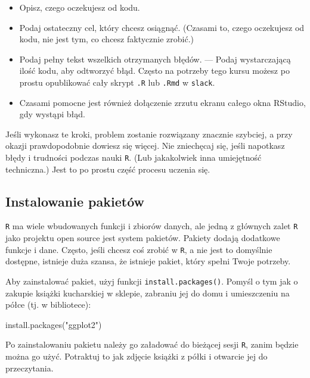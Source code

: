 \documentclass[
]{article}
\newenvironment{Shaded}{\begin{snugshade}}{\end{snugshade}}
\newcommand{\FunctionTok}[1]{\textcolor[rgb]{0.00,0.00,0.00}{#1}}
\newcommand{\NormalTok}[1]{#1}
\newcommand{\StringTok}[1]{\textcolor[rgb]{0.31,0.60,0.02}{#1}}
\providecommand{\tightlist}{%
  \setlength{\itemsep}{0pt}\setlength{\parskip}{0pt}}
\begin{document}
\begin{itemize}
\tightlist
\item
  Opisz, czego oczekujesz od kodu.
\item
  Podaj ostateczny cel, który chcesz osiągnąć. (Czasami to, czego
  oczekujesz od kodu, nie jest tym, co chcesz faktycznie zrobić.)
\item
  Podaj pełny tekst wszelkich otrzymanych błędów. --- Podaj
  wystarczającą ilość kodu, aby odtworzyć błąd. Często na potrzeby tego
  kursu możesz po prostu opublikować cały skrypt \texttt{.R} lub
  \texttt{.Rmd} w \texttt{slack}.
\item
  Czasami pomocne jest również dołączenie zrzutu ekranu całego okna
  RStudio, gdy wystąpi błąd.
\end{itemize}

Jeśli wykonasz te kroki, problem zostanie rozwiązany znacznie szybciej,
a przy okazji prawdopodobnie dowiesz się więcej. Nie zniechęcaj się,
jeśli napotkasz błędy i trudności podczas nauki \texttt{R}. (Lub
jakakolwiek inna umiejętność techniczna.) Jest to po prostu część
procesu uczenia się.

\hypertarget{instalowanie-pakietuxf3w}{%
\subsection{Instalowanie pakietów}\label{instalowanie-pakietuxf3w}}

\texttt{R} ma wiele wbudowanych funkcji i zbiorów danych, ale jedną z
głównych zalet \texttt{R} jako projektu open source jest system
pakietów. Pakiety dodają dodatkowe funkcje i dane. Często, jeśli chcesz
coś zrobić w \texttt{R}, a nie jest to domyślnie dostępne, istnieje duża
szansa, że istnieje pakiet, który spełni Twoje potrzeby.

Aby zainstalować pakiet, użyj funkcji \texttt{install.packages()}.
Pomyśl o tym jak o zakupie książki kucharskiej w sklepie, zabraniu jej
do domu i umieszczeniu na półce (tj. w bibliotece):

\begin{Shaded}
\begin{Highlighting}[]
\FunctionTok{install.packages}\NormalTok{(}\StringTok{"ggplot2"}\NormalTok{)}
\end{Highlighting}
\end{Shaded}

Po zainstalowaniu pakietu należy go załadować do bieżącej sesji
\texttt{R}, zanim będzie można go użyć. Potraktuj to jak zdjęcie książki
z półki i otwarcie jej do przeczytania.
\end{document}

